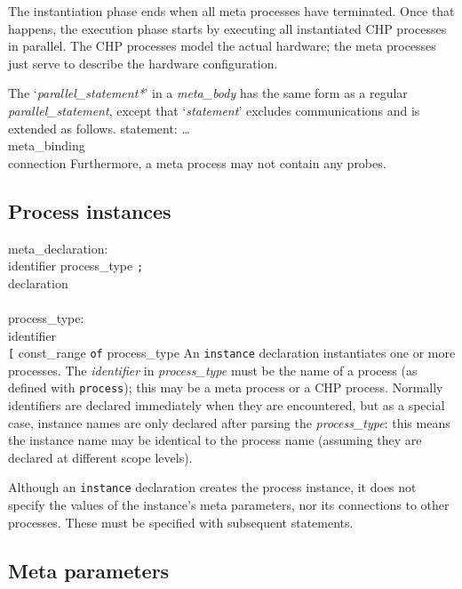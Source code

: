 The instantiation phase ends when all meta processes have terminated.
Once that happens, the execution phase starts by executing all instantiated
CHP processes in parallel. The CHP processes
model the actual hardware; the meta processes just serve to describe
the hardware configuration.

The `{\it{}parallel\_statement*}' in a {\it{}meta\_body} has the same form as
a regular {\it{}parallel\_statement}, except that `{\it{}statement}' excludes
communications and is extended as follows.
\grammarstart
statement:
      \>\dots \\
\orbox \>meta\_binding \\
\orbox \>connection
\grammarend
Furthermore, a meta process may not contain any probes.


\subsection{Process instances}\label{sec:instance}

\grammarstart
meta\_declaration: \\
        identifier\LIST {\tt{}:} process\_type {\tt{};} \\
\orbox \>declaration \\
 \\
process\_type: \\
       \>identifier \\
\orbox {} {\tt{}[} const\_range\LIST {\tt{}]} {\tt{}of} process\_type
\grammarend
An {\tt{}instance} declaration instantiates one or more processes. The
{\it{}identifier} in {\it{}process\_type} must be the name of a process
(as defined with {\tt{}process}); this may be a meta process or a
CHP process. Normally identifiers are declared immediately when
they are encountered, but as a special case, instance names are only declared
after parsing the {\it{}process\_type}: this means the instance name
may be identical to the process name (assuming they are declared at
different scope levels).

Although an {\tt{}instance} declaration creates the
process instance, it does not specify the values of the instance's
meta parameters, nor its connections to other processes. These must be
specified with subsequent statements.


\subsection{Meta parameters}\label{sec:metaparam}

